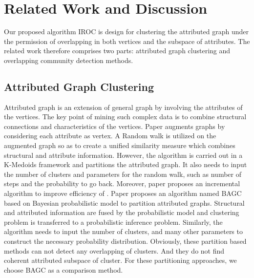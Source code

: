\section{Related Work and Discussion}
Our proposed algorithm IROC is design for clustering the attributed graph under the permission of overlapping in both vertices and the subspace of attributes. The related work therefore comprises two parts: attributed graph clustering and overlapping community detection methods.

\subsection{Attributed Graph Clustering}
Attributed graph is an extension of general graph by involving the attributes of the vertices. The key point of mining such complex data is to combine structural connections and characteristics of the vertices. Paper \cite{DBLP:journals/pvldb/ZhouCY09} augments graphs by considering each attribute as vertex. A Random walk is utilized on the augmented graph so as to create a unified similarity measure which combines structural and attribute information. However, the algorithm is carried out in a K-Medoids framework and partitions the attributed graph. It also needs to input the number of clusters and parameters for the random walk, such as number of steps and the probability to go back. Moreover, paper \cite{DBLP:conf/icdm/ZhouCY10} proposes an incremental algorithm to improve efficiency of \cite{DBLP:journals/pvldb/ZhouCY09}. Paper \cite{DBLP:conf/sigmod/XuKWCC12} proposes an algorithm named BAGC based on Bayesian probabilistic model to partition attributed graphs. Structural and attributed information are fused by the probabilistic model and clustering problem is transferred to a probabilistic inference problem. Similarly, the algorithm needs to input the number of clusters, and many other parameters to construct the necessary probability distribution. Obviously, these partition based methods can not detect any overlapping of clusters. And they do not find coherent attributed subspace of cluster. For these partitioning approaches, we choose BAGC as a comparison method. 


